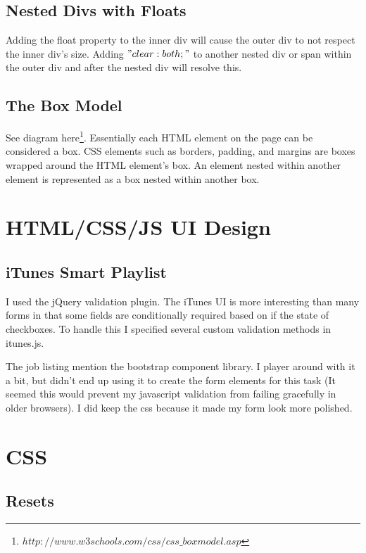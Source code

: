 \documentclass[12pt]{amsart}
\begin{document}
\subsection{Nested Divs with Floats}

Adding the float property to the inner div will cause the outer div to not respect the inner div's size. Adding $"clear:both;"$ to another nested div or span within the outer div and after the nested div will resolve this.


\subsection{The Box Model}

See diagram here\footnote[5]{$http://www.w3schools.com/css/css\_boxmodel.asp$}. Essentially each HTML element on the page can be considered a box. CSS elements such as borders, padding, and margins are boxes wrapped around the HTML element's box. An element nested within another element is represented as a box nested within another box.



\section{HTML/CSS/JS UI Design}


\subsection{iTunes Smart Playlist}

I used the jQuery validation plugin. The iTunes UI is more interesting than many forms in that some fields are conditionally required based on if the state of checkboxes. To handle this I specified several custom validation methods in itunes.js.

The job listing mention the bootstrap component library. I player around with it a bit, but didn't end up using it to create the form elements for this task (It seemed this would prevent my javascript validation from failing gracefully in older browsers). I did keep the css because it made my form look more polished.

\section{CSS}

\subsection{Resets}
\end{document}
